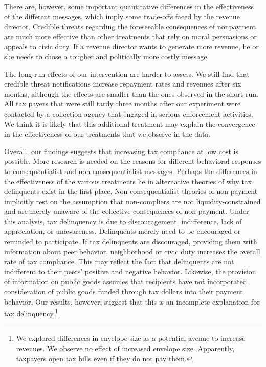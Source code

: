 \documentclass[12pt]{article}
\begin{document}
There are, however, some important quantitative differences in the
effectiveness of the different messages, which imply some trade-offs
faced by the revenue director. Credible threats regarding the
foreseeable consequences of nonpayment are much more effective than
other treatments that rely on moral persuasions or appeals to civic
duty. If a revenue director wants to generate more revenue, he or she
needs to chose a tougher and politically more costly message.

The long-run effects of our intervention are harder to assess.  We
still find that credible threat notifications increase repayment rates
and revenues after six months, although the effects are smaller than
the ones observed in the short run.  All tax payers that were still
tardy three months after our experiment were contacted by a collection
agency that engaged in serious enforcement activities. We think it is likely
that this additional treatment may explain the convergence in the
effectiveness of our treatments that we observe in the data.

Overall, our findings suggests that increasing tax compliance at low cost
is possible. More research is needed on the reasons for different
behavioral responses to consequentialist and non-consequentialist
messages. Perhaps the differences in the effectiveness of the various
treatments lie in alternative theories of why tax delinquents exist in
the first place. Non-consequentialist theories of non-payment
implicitly rest on the assumption that non-compliers are not
liquidity-constrained and are merely unaware of the collective
consequences of non-payment. Under this analysis, tax delinquency is
due to discouragement, indifference, lack of appreciation, or
unawareness. Delinquents merely need to be encouraged or reminded to
participate. If tax delinquents are discouraged, providing them with
information about peer behavior, neighborhood or civic duty increases 
the overall rate of tax compliance. This may
reflect the fact that delinquents are not indifferent to their peers'
positive and negative behavior. Likewise, the provision of information
on public goods assumes that recipients have not incorporated
consideration of public goods funded through tax dollars into their
payment behavior.  Our results, however, suggest that this is an
incomplete explanation for tax delinquency.\footnote{We explored
  differences in envelope size as a potential avenue to increase
  revenues. We observe no effect of increased envelope size.
  Apparently, taxpayers open tax bills even if they do not pay them.}
\end{document}

